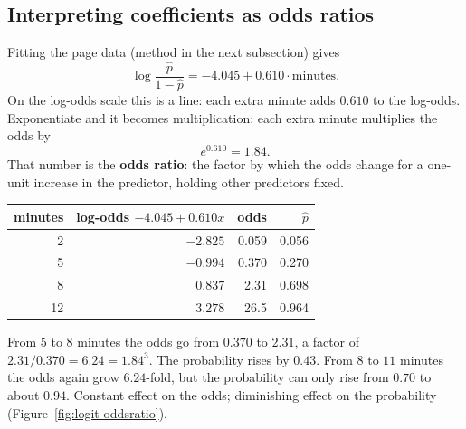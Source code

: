 \subsection{Interpreting coefficients as odds ratios}

Fitting the page data (method in the next subsection) gives
\[
  \log\frac{\hat p}{1-\hat p} = -4.045 + 0.610\cdot\text{minutes}.
\]
On the log-odds scale this is a line: each extra minute adds $0.610$ to the log-odds.
Exponentiate and it becomes multiplication: each extra minute multiplies the odds by
\[
  e^{0.610} = 1.84 .
\]
That number is the \textbf{odds ratio}: the factor by which the odds change for a one-unit
increase in the predictor, holding other predictors fixed.

\begin{center}
\begin{tabular}{rrrr}
\toprule
minutes & log-odds $-4.045 + 0.610x$ & odds & $\hat p$\\
\midrule
2 & $-2.825$ & 0.059 & 0.056\\
5 & $-0.994$ & 0.370 & 0.270\\
8 & $0.837$ & 2.31 & 0.698\\
12 & $3.278$ & 26.5 & 0.964\\
\bottomrule
\end{tabular}
\end{center}

From $5$ to $8$ minutes the odds go from $0.370$ to $2.31$, a factor of
$2.31/0.370 = 6.24 = 1.84^3$. The probability rises by $0.43$. From $8$ to $11$ minutes
the odds again grow $6.24$-fold, but the probability can only rise from $0.70$ to about
$0.94$. Constant effect on the odds; diminishing effect on the probability
(Figure~\ref{fig:logit-oddsratio}).

